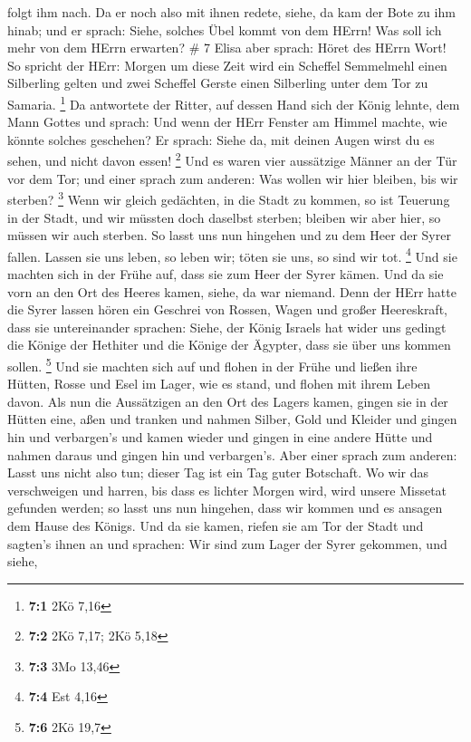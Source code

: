 folgt ihm nach.  Da er noch also mit ihnen redete, siehe,
da kam der Bote zu ihm hinab; und er sprach: Siehe, solches Übel kommt
von dem HErrn! Was soll ich mehr von dem HErrn erwarten? \# 7
 Elisa aber sprach: Höret des HErrn Wort! So spricht der
HErr: Morgen um diese Zeit wird ein Scheffel Semmelmehl einen Silberling
gelten und zwei Scheffel Gerste einen Silberling unter dem Tor zu
Samaria. \footnote{\textbf{7:1} 2Kö 7,16}  Da antwortete der
Ritter, auf dessen Hand sich der König lehnte, dem Mann Gottes und
sprach: Und wenn der HErr Fenster am Himmel machte, wie könnte solches
geschehen? Er sprach: Siehe da, mit deinen Augen wirst du es sehen, und
nicht davon essen! \footnote{\textbf{7:2} 2Kö 7,17; 2Kö 5,18}
 Und es waren vier aussätzige Männer an der Tür vor dem Tor;
und einer sprach zum anderen: Was wollen wir hier bleiben, bis wir
sterben? \footnote{\textbf{7:3} 3Mo 13,46}  Wenn wir gleich
gedächten, in die Stadt zu kommen, so ist Teuerung in der Stadt, und wir
müssten doch daselbst sterben; bleiben wir aber hier, so müssen wir auch
sterben. So lasst uns nun hingehen und zu dem Heer der Syrer fallen.
Lassen sie uns leben, so leben wir; töten sie uns, so sind wir tot.
\footnote{\textbf{7:4} Est 4,16}  Und sie machten sich in
der Frühe auf, dass sie zum Heer der Syrer kämen. Und da sie vorn an den
Ort des Heeres kamen, siehe, da war niemand.  Denn der HErr
hatte die Syrer lassen hören ein Geschrei von Rossen, Wagen und großer
Heereskraft, dass sie untereinander sprachen: Siehe, der König Israels
hat wider uns gedingt die Könige der Hethiter und die Könige der
Ägypter, dass sie über uns kommen sollen. \footnote{\textbf{7:6} 2Kö
  19,7}  Und sie machten sich auf und flohen in der Frühe
und ließen ihre Hütten, Rosse und Esel im Lager, wie es stand, und
flohen mit ihrem Leben davon.  Als nun die Aussätzigen an
den Ort des Lagers kamen, gingen sie in der Hütten eine, aßen und
tranken und nahmen Silber, Gold und Kleider und gingen hin und
verbargen's und kamen wieder und gingen in eine andere Hütte und nahmen
daraus und gingen hin und verbargen's.  Aber einer sprach
zum anderen: Lasst uns nicht also tun; dieser Tag ist ein Tag guter
Botschaft. Wo wir das verschweigen und harren, bis dass es lichter
Morgen wird, wird unsere Missetat gefunden werden; so lasst uns nun
hingehen, dass wir kommen und es ansagen dem Hause des Königs.
 Und da sie kamen, riefen sie am Tor der Stadt und sagten's
ihnen an und sprachen: Wir sind zum Lager der Syrer gekommen, und siehe,
